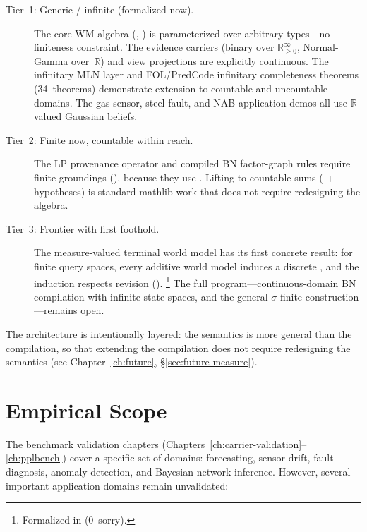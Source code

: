 \documentclass[11pt,openany]{report}
\begin{document}
\begin{description}
\item[Tier~1: Generic / infinite (formalized now).]
  The core WM algebra (,
  ) is parameterized over arbitrary types---no
  finiteness constraint.  The evidence carriers (binary over
  $\mathbb{R}_{\ge 0}^\infty$, Normal-Gamma over~$\mathbb{R}$)
  and view projections are explicitly continuous.  The infinitary
  MLN layer and FOL/PredCode infinitary
  completeness theorems (34~theorems) demonstrate extension to
  countable and uncountable domains.  The gas sensor, steel
  fault, and NAB application demos all use $\mathbb{R}$-valued
  Gaussian beliefs.

\item[Tier~2: Finite now, countable within reach.]
  The LP provenance operator and compiled BN factor-graph rules
  require finite groundings (), because they use
  .  Lifting to countable sums ( +
   hypotheses) is standard mathlib work that does
  not require redesigning the algebra.

\item[Tier~3: Frontier with first foothold.]
  The measure-valued terminal world model has its first concrete
  result: for finite query spaces, every additive world model
  induces a discrete , and the
  induction respects revision
  ().%
  \footnote{Formalized in
  (0~sorry).}
  The full program---continuous-domain BN compilation with
  infinite state spaces, and the general $\sigma$-finite
  construction---remains open.
\end{description}

\noindent
The architecture is intentionally layered: the semantics is more
general than the compilation, so that extending the compilation
does not require redesigning the semantics
(see Chapter~\ref{ch:future}, \S\ref{sec:future-measure}).

\section{Empirical Scope}

The benchmark validation chapters
(Chapters~\ref{ch:carrier-validation}--\ref{ch:pplbench}) cover a
specific set of domains: forecasting, sensor drift, fault diagnosis,
anomaly detection, and Bayesian-network inference.  However, several
important application domains remain unvalidated:
\end{document}
